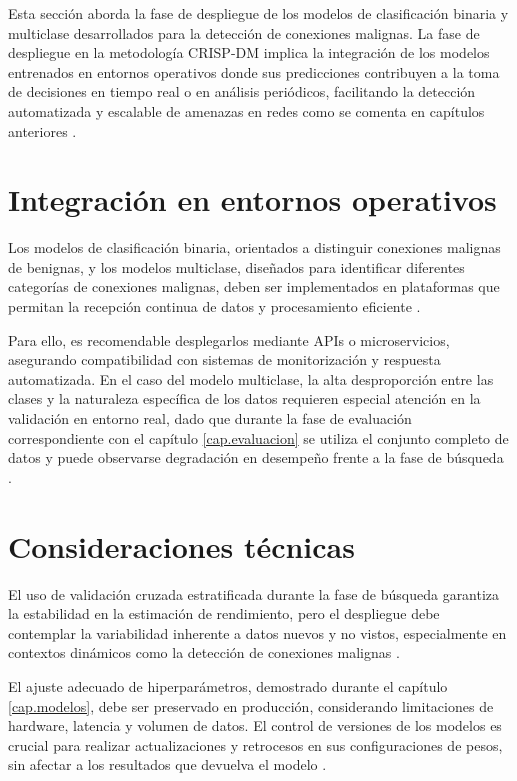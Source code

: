 Esta sección aborda la fase de despliegue de los modelos de clasificación binaria y multiclase desarrollados para la detección de conexiones malignas. La fase de despliegue en la metodología CRISP-DM implica la integración de los modelos entrenados en entornos operativos donde sus predicciones contribuyen a la toma de decisiones en tiempo real o en análisis periódicos, facilitando la detección automatizada y escalable de amenazas en redes como se comenta en capítulos anteriores \cite{wirth2000crisp}.

\section{Integración en entornos operativos}

Los modelos de clasificación binaria, orientados a distinguir conexiones malignas de benignas, y los modelos multiclase, diseñados para identificar diferentes categorías de conexiones malignas, deben ser implementados en plataformas que permitan la recepción continua de datos y procesamiento eficiente \cite{baylor2017tensorflow}. 

Para ello, es recomendable desplegarlos mediante APIs o microservicios, asegurando compatibilidad con sistemas de monitorización y respuesta automatizada. En el caso del modelo multiclase, la alta desproporción entre las clases y la naturaleza específica de los datos requieren especial atención en la validación en entorno real, dado que durante la fase de evaluación correspondiente con el capítulo \ref{cap.evaluacion} se utiliza el conjunto completo de datos y puede observarse degradación en desempeño frente a la fase de búsqueda \cite{gama2014survey}.

\section{Consideraciones técnicas}

El uso de validación cruzada estratificada durante la fase de búsqueda garantiza la estabilidad en la estimación de rendimiento, pero el despliegue debe contemplar la variabilidad inherente a datos nuevos y no vistos, especialmente en contextos dinámicos como la detección de conexiones malignas \cite{reimers2017optimal}. 

El ajuste adecuado de hiperparámetros, demostrado durante el capítulo \ref{cap.modelos}, debe ser preservado en producción, considerando limitaciones de hardware, latencia y volumen de datos. El control de versiones de los modelos es crucial para realizar actualizaciones y retrocesos en sus configuraciones de pesos, sin afectar a los resultados que devuelva el modelo \cite{peters2017machine}.


